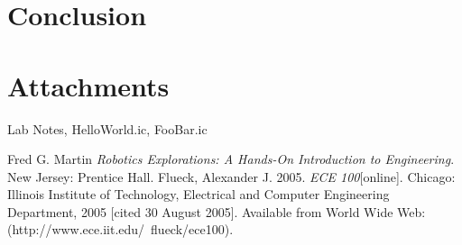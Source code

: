 \documentclass[a4paper, 11pt]{article}
\begin{document}
\section*{Conclusion}
\lipsum[6]


\section*{Attachments}
Lab Notes, HelloWorld.ic, FooBar.ic

\begin{thebibliography}{9}
 Fred G. Martin \emph{Robotics Explorations: A Hands-On Introduction to Engineering}. New Jersey: Prentice Hall.
  Flueck, Alexander J. 2005. \emph{ECE 100}[online]. Chicago: Illinois Institute of Technology, Electrical and Computer Engineering Department, 2005 [cited 30 August 2005]. Available from World Wide Web: (http://www.ece.iit.edu/~flueck/ece100).
\end{thebibliography}
\end{document}
